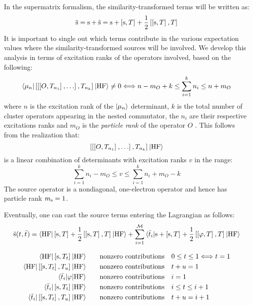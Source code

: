 In the supermatrix formalism, the similarity-transformed terms will be
written as:
\begin{equation}
  \overline{\mathrm{s}} = \mathrm{s} + \tilde{\mathrm{s}} = \mathrm{s} +
  \left[ \mathrm{s}, T \right]^{} +
  \frac{1}{2}\left[ \left[ \mathrm{s}, T \right]^{}, T \right]^{}
\end{equation}
It is important to single out which terms contribute in the various
expectation values where the similarity-transformed sources will be
involved.
We develop this analysis in terms of excitation ranks of the
operators involved, based on the following:
\begin{equation}
  \braket{\mu_n |
  \left[ \left[ \left[ O, T_{n_1} \right]^{}, \ldots \right]^{}, T_{n_k} \right]^{} | \mathrm{HF}} \neq 0
  \Longleftrightarrow
  n - m_O + k \leq \sum_{i=1}^k n_i \leq n + m_O
\end{equation}
where $n$ is the excitation rank of the $\ket{\mu_n}$ determinant, $k$
is the total number of cluster operators appearing in the nested
commutator, the $n_i$ are their respective excitations ranks and $m_O$
is the \emph{particle rank} of the operator $O$ \cite{Helgaker2000-tz}.
This follows from the realization that:
\begin{equation}
  \left[ \left[ \left[ O, T_{n_1} \right]^{}, \ldots \right]^{}, T_{n_k} \right]^{} \ket{\mathrm{HF}}
\end{equation}
is a linear combination of determinants with excitation ranks $v$ in the
range:
\begin{equation}
  \sum_{i=1}^k n_i - m_O \leq v \leq \sum_{i=1}^k n_i + m_O -k
\end{equation}
The source operator is a nondiagonal, one-electron
operator and hence has particle rank $m_{\mathrm{s}} = 1$.

Eventually, one can cast the source terms entering the Lagrangian as
follows:
\begin{equation}
  \tilde{\mathrm{s}}(t_{}, \bar{t}_{}) =
  \braket{\mathrm{HF} | \left[ \mathrm{s}, T \right]^{} + \frac{1}{2}\left[ \left[ \mathrm{s}, T \right]^{}, T \right]^{} | \mathrm{HF}}
  + \sum_{i=1}^{\mathcal{M}}\braket{\bar{t}_{i} | \mathrm{s} + \left[ \mathrm{s}, T \right]^{} + \frac{1}{2}\left[ \left[ \varphi, T \right]^{}, T \right]^{} | \mathrm{HF}}
\end{equation}

\begin{align}
  \braket{\mathrm{HF} |
  \left[ \mathrm{s}, T_t \right]^{}
  | \mathrm{HF}}
  &\quad\quad\text{nonzero contributions} \quad 0 \leq t \leq 1
  \Longleftrightarrow t = 1 \\
  \braket{\mathrm{HF} |
  \left[ \left[ \mathrm{s}, T_t \right]^{}, T_u \right]^{}
  | \mathrm{HF}}
  &\quad\quad\text{nonzero contributions} \quad t + u = 1 \\
  \braket{\bar{t}_{i} |
  \varphi
  | \mathrm{HF} }
  &\quad\quad\text{nonzero contributions} \quad i = 1 \\
  \braket{\bar{t}_{i} |
  \left[ \mathrm{s}, T_t \right]^{}
  | \mathrm{HF} }
  &\quad\quad\text{nonzero contributions} \quad i \leq t \leq i + 1 \\
  \braket{\bar{t}_{i} |
  \left[ \left[ \mathrm{s}, T_t \right]^{}, T_u \right]^{}
  | \mathrm{HF} }
  &\quad\quad\text{nonzero contributions} \quad t + u = i + 1
\end{align}

